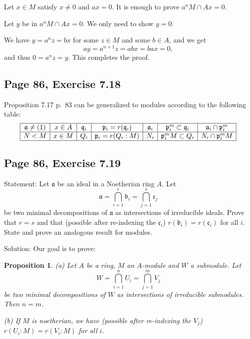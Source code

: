 \documentclass[parskip=half,fontsize=12pt]{scrartcl}%
\newcommand{\mf}{\mathfrak}
\newcommand{\aaa}{\mf a}
\newcommand{\bbb}{\mf b}
\newcommand{\ccc}{\mf c}
\newcommand{\ppp}{\mf p}
\newcommand{\qqq}{\mf q}
\newtheorem{prop}[thm]{Proposition}
\begin{document}
Let $x\in M$ satisfy $x\ne0$ and $ax=0$. It is enough to prove $a^nM\cap Ax=0$. 

Let $y$ be in $a^nM\cap Ax=0$. We only need to show $y=0$. 

We have $y=a^nz=bx$ for some $z\in M$ and some $b\in A$, and we get 
$$
ay=a^{n+1}z=abx=bax=0,
$$ 
and thus $0=a^nz=y$. This completes the proof.%

\subsection{Page 86, Exercise 7.18}%

Proposition 7.17 p.~83 can be generalized to modules according to the following table: 
$$
\begin{array}{|c|c|c|c|c|c|c|}\hline
\aaa\ne(1)&x\in A&\qqq_i&\ppp_i=r(\qqq_i)&\aaa_i&\ppp_i^m\subset\qqq_i&\aaa_i\cap\ppp_i^m\\ \hline
N<M&x\in M&Q_i&\ppp_i=r(Q_i:M)&N_i&\ppp_i^mM\subset Q_i&N_i\cap\ppp_i^mM\\ \hline
\end{array}
$$ 

\subsection{Page 86, Exercise 7.19}%

Statement: Let $\aaa$ be an ideal in a Noetherian ring $A$. Let 
$$
\mathfrak{a}=\bigcap_{i=1}^r\mathfrak{b}_i=\bigcap_{j=1}^s\mathfrak{c}_j
$$ 
be two minimal decompositions of $\aaa$ as intersections of irreducible ideals. Prove that $r=s$ and that (possible after re-indexing the $\ccc_i$) $r(\bbb_i)=r(\ccc_i)$ for all $i$. State and prove an analogous result for modules.

Solution: Our goal is to prove:

\begin{prop}\label{719P1}
(a) Let $A$ be a ring, $M$ an $A$-module and $W$ a submodule. Let 
$$
W=\bigcap_{i=1}^nU_i=\bigcap_{j=1}^mV_j
$$ 
be two minimal decompositions of $W$ as intersections of irreducible submodules. Then $n=m$.

(b) If $M$ is noetherian, we have (possible after re-indexing the $V_j$) $r(U_i:M)=r(V_i:M)$ for all $i$.
\end{prop}
\end{document}
